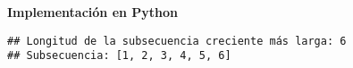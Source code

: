 \begin{enumerate}[label=\color{red}\textbf{\arabic*)}]
    \textbf{Implementación en Python} 
    
    \begin{verbatim}
## Longitud de la subsecuencia creciente más larga: 6
## Subsecuencia: [1, 2, 3, 4, 5, 6]
    \end{verbatim}
\end{enumerate}

